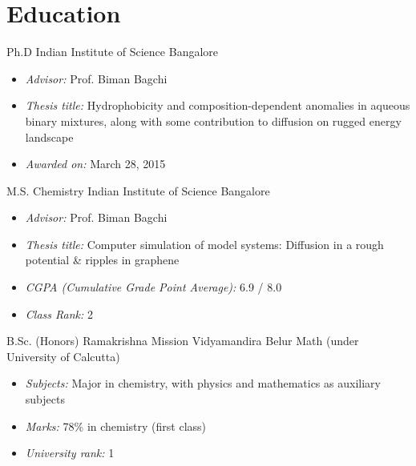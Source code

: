 \section{Education}
        {Ph.D}
        {Indian Institute of Science}
        {Bangalore}
        {}
        {\vspace{-1.0em}%
         \begin{itemize}%
         \setlength{\itemsep}{0.35em}
              \item {\itshape\color{color2} Advisor:} Prof. Biman Bagchi
              \item {\itshape\color{color2} Thesis title:} %
                    Hydrophobicity and composition-dependent anomalies in aqueous binary mixtures,
                    along with some contribution to diffusion on rugged energy landscape
              \item {\itshape\color{color2} Awarded on:} March 28, 2015
         \end{itemize}
        }

        {M.S. Chemistry}
        {Indian Institute of Science}
        {Bangalore}
        {}
        {\vspace{-1.0em}%
         \begin{itemize}%
         \setlength{\itemsep}{0.35em}
              \item {\itshape\color{color2} Advisor:} Prof. Biman Bagchi
              \item {\itshape\color{color2} Thesis title:} %
                    Computer simulation of model systems: Diffusion in a rough potential \& ripples in graphene
              \item {\itshape\color{color2} CGPA (Cumulative Grade Point Average):} 6.9 / 8.0
              \item {\itshape\color{color2} Class Rank:} 2
         \end{itemize}
        }

        {B.Sc. (Honors)}
        {Ramakrishna Mission Vidyamandira}
        {Belur Math (under University of Calcutta)}
        {}
        {\vspace{-1.0em}%
         \begin{itemize}%
         \setlength{\itemsep}{0.35em}
              \item {\itshape\color{color2} Subjects:} %
                    Major in chemistry, with physics and mathematics as auxiliary subjects
              \item {\itshape\color{color2} Marks:} 78\% in chemistry (first class)
              \item {\itshape\color{color2} University rank:} 1
         \end{itemize}
        }

